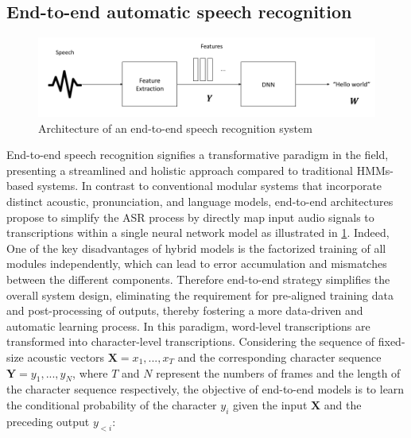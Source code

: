\subsection{End-to-end automatic speech recognition} %
\label{section:SOTAE2E}
\begin{figure}
    \centering
    \includegraphics[width=\textwidth]{imgs/End2End_architeccture.png}
    \caption{Architecture of an end-to-end speech recognition system}
    \label{fig:e2e_archi}
\end{figure}
 End-to-end speech recognition signifies a transformative paradigm in the field, presenting a streamlined and holistic approach compared to traditional HMMs-based systems. In contrast to conventional modular systems that incorporate distinct acoustic, pronunciation, and language models, end-to-end architectures propose to simplify the ASR process by directly map input audio signals to transcriptions within a single neural network model as illustrated in \ref{fig:e2e_archi}. Indeed, One of the key disadvantages of hybrid models is the factorized training of all modules independently, which can lead to error accumulation and mismatches between the different components. Therefore end-to-end strategy simplifies the overall system design, eliminating the requirement for pre-aligned training data and post-processing of outputs, thereby fostering a more data-driven and automatic learning process.
 In this paradigm, word-level transcriptions are transformed into character-level transcriptions. Considering the sequence of fixed-size acoustic vectors $\boldsymbol{X}=x_1,...,x_T$ and the corresponding character sequence $\boldsymbol{Y}=y_1,...,y_N$, where $T$ and $N$ represent the numbers of frames and the length of the character sequence respectively, the objective of end-to-end models is to learn the conditional probability of the character $y_i$ given the input $\boldsymbol{X}$ and the preceding output $y_{<i}$:
